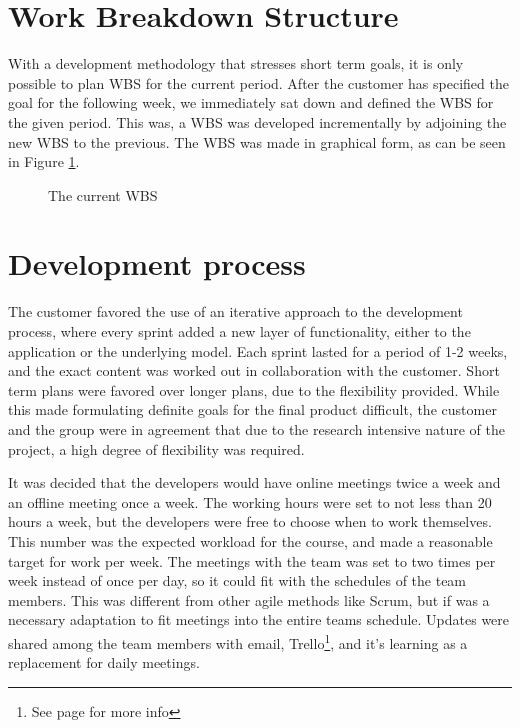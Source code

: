 \section{Work Breakdown Structure}
With a development methodology that stresses short term goals, it is only possible to plan WBS for the current period. After the customer has specified the goal for the following week, we immediately sat down and defined the WBS for the given period. This was, a WBS was developed incrementally by adjoining the new WBS to the previous. The WBS was made in graphical form, as can be seen in Figure \ref{fig:WBS}.

\begin{figure}[p]

\setlength\fboxsep{0pt}
\setlength\fboxrule{1pt}\noindent{}

\caption{The current WBS}
\label{fig:WBS}
\end{figure}

\section{Development process}
\label{def:devProcess}

The customer favored the use of an iterative approach to the development process, where every sprint added a new layer of functionality, either to the application or the underlying model. Each sprint lasted for a period of 1-2 weeks, and the exact content was worked out in collaboration with the customer. Short term plans were favored over longer plans, due to the flexibility provided. While this made formulating definite goals for the final product difficult, the customer and the group were in agreement that due to the research intensive nature of the project, a high degree of flexibility was required. 

It was decided that the developers would have online meetings twice a week and an offline meeting once a week. 
The working hours were set to not less than 20 hours a week, but the developers were free to choose when to work themselves. This number was the expected workload for the course, and made a reasonable target for work per week. The meetings with the team was set to two times per week instead of once per day, so it could fit with the schedules of the team members. This was different from other agile methods like Scrum, but if was a necessary adaptation to fit meetings into the entire teams schedule. Updates were shared among the team members with email, Trello\footnote{See page \pageref{def:trello} for more info}, and it's learning as a replacement for daily meetings.


